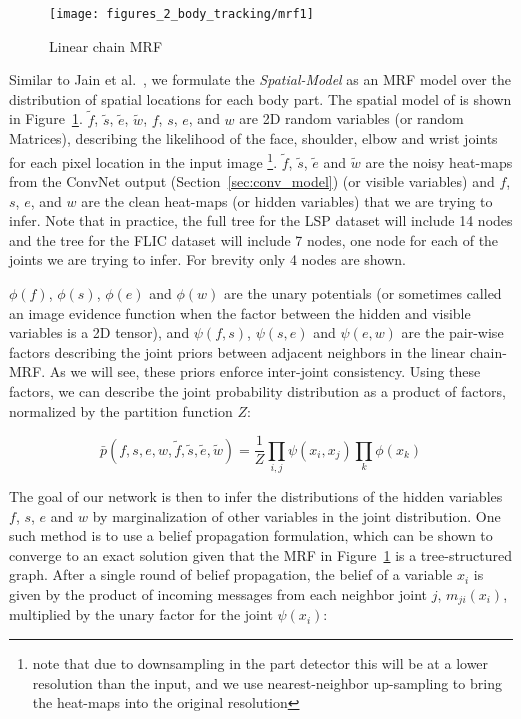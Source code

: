\begin{figure}[th]
  \centering
    \texttt{[image: figures\_2\_body\_tracking/mrf1]}
    \caption{Linear chain MRF}
  \label{fig:mrf1} 
\end{figure}

Similar to Jain et al.~\cite{jainiclr2014}, we formulate the \emph{Spatial-Model} as an MRF model over the distribution of spatial locations for each body part.  The spatial model of \cite{jainiclr2014} is shown in Figure~\ref{fig:mrf1}. $\tilde{f}$, $\tilde{s}$, $\tilde{e}$, $\tilde{w}$, $f$, $s$, $e$, and $w$ are 2D random variables (or random Matrices), describing the likelihood of the face, shoulder, elbow and wrist joints for each pixel location in the input image \footnote{note that due to downsampling in the part detector this will be at a lower resolution than the input, and we use nearest-neighbor up-sampling to bring the heat-maps into the original resolution}. $\tilde{f}$, $\tilde{s}$, $\tilde{e}$ and $\tilde{w}$ are the noisy heat-maps from the ConvNet output (Section~\ref{sec:conv_model}) (or visible variables) and $f$, $s$, $e$, and $w$ are the clean heat-maps (or hidden variables) that we are trying to infer. Note that in practice, the full tree for the LSP dataset will include 14 nodes and the tree for the FLIC dataset will include 7 nodes, one node for each of the joints we are trying to infer.  For brevity only 4 nodes are shown.

$\phi(f)$, $\phi(s)$, $\phi(e)$ and $\phi(w)$ are the unary potentials (or sometimes called an image evidence function when the factor between the hidden and visible variables is a 2D tensor), and $\psi(f,s)$, $\psi(s,e)$ and $\psi(e,w)$ are the pair-wise factors describing the joint priors between adjacent neighbors in the linear chain-MRF. As we will see, these priors enforce inter-joint consistency.  Using these factors, we can describe the joint probability distribution as a product of factors, normalized by the partition function $Z$:

\begin{equation}
\bar{p}\left(f,s,e,w,\tilde{f},\tilde{s},\tilde{e},\tilde{w}\right) = \frac{1}{Z}\prod_{i,j}\psi\left(x_i,x_j\right)\prod_{k}\phi\left(x_k\right)
\label{eq:mrf1}
\end{equation}

The goal of our network is then to infer the distributions of the hidden variables $f$, $s$, $e$ and $w$ by marginalization of other variables in the joint distribution. One such method is to use a belief propagation formulation, which can be shown to converge to an exact solution given that the MRF in Figure~\ref{fig:mrf1} is a tree-structured graph. After a single round of belief propagation, the belief of a variable $x_i$ is given by the product of incoming messages from each neighbor joint $j$, $m_{ji}\left(x_i\right)$, multiplied by the unary factor for the joint $\psi\left(x_i\right)$: 

